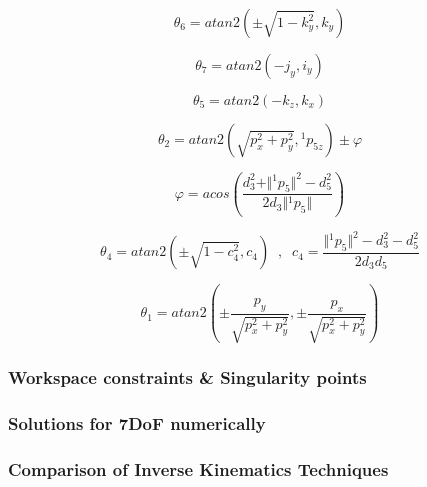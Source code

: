 \begin{equation}
θ_6 = atan2 \left( \pm \sqrt{1-k_y^2}, k_y \right)
\end{equation}

\[
θ_7 = atan2 \left( -j_y, i_y \right)
\]

\[
θ_5 = atan2 \left( - k_z, k_x \right)
\]

\[
θ_2 = atan2 \left( \sqrt{p_x^2 + p_y^2}, {}^1p_{5z} \right) \pm φ
\]

\[
φ = acos \left( \frac{d_3^2 + \Vert{}^1p_{5}\Vert ^2 - d_5^2}{2d_3 \Vert{}^1p_{5}\Vert} \right)
\]

\[
θ_4 = atan2 \left( \pm \sqrt{1 - c_4^2}, c_4 \right) \;\; , \;\; c_4 = \frac{ \Vert{}^1p_{5}\Vert ^2 - d_3^2 - d_5^2 }{2d_3d_5}
\]

\[
θ_1 = atan2 \left( \pm \frac{p_y}{\sqrt{p_x^2 + p_y^2}} , \pm \frac{p_x}{\sqrt{p_x^2 + p_y^2}} \right)
\]

\subsubsection{Workspace constraints \& Singularity points}

\subsubsection{Solutions for 7DoF numerically}

\subsubsection{Comparison of Inverse Kinematics Techniques}
